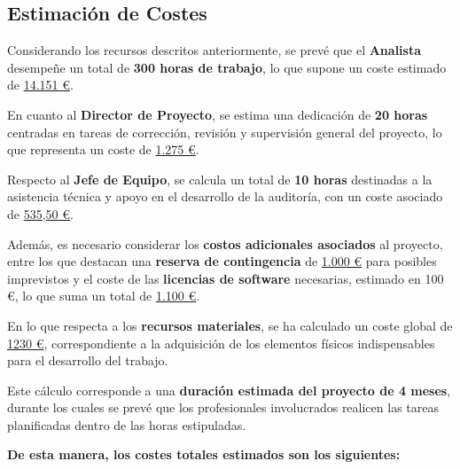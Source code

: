\documentclass[a4paper, 10pt]{article}
\begin{document}
\subsection{Estimación de Costes}

Considerando los recursos descritos anteriormente, se prevé que el \textbf{Analista} desempeñe un total de \textbf{300 horas de trabajo}, lo que supone un coste estimado de \underline{14.151 €}.  
\par\vspace{0.3cm}

En cuanto al \textbf{Director de Proyecto}, se estima una dedicación de \textbf{20 horas} centradas en tareas de corrección, revisión y supervisión general del proyecto, lo que representa un coste de \underline{1.275 €}.  
\par\vspace{0.3cm}

Respecto al \textbf{Jefe de Equipo}, se calcula un total de \textbf{10 horas} destinadas a la asistencia técnica y apoyo en el desarrollo de la auditoría, con un coste asociado de \underline{535,50 €}.  
\par\vspace{0.3cm}

Además, es necesario considerar los \textbf{costos adicionales asociados} al proyecto, entre los que destacan una \textbf{reserva de contingencia} de \underline{1.000 €} para posibles imprevistos y el coste de las \textbf{licencias de software} necesarias, estimado en 100 €, lo que suma un total de \underline{1.100 €}.  
\par\vspace{0.3cm}

En lo que respecta a los \textbf{recursos materiales}, se ha calculado un coste global de \underline{1230 €}, correspondiente a la adquisición de los elementos físicos indispensables para el desarrollo del trabajo.  
\par\vspace{0.3cm}

Este cálculo corresponde a una \textbf{duración estimada del proyecto de 4 meses}, durante los cuales se prevé que los profesionales involucrados realicen las tareas planificadas dentro de las horas estipuladas.  

\par\vspace{0.5cm}
\textbf{De esta manera, los costes totales estimados son los siguientes:}  
\end{document}
